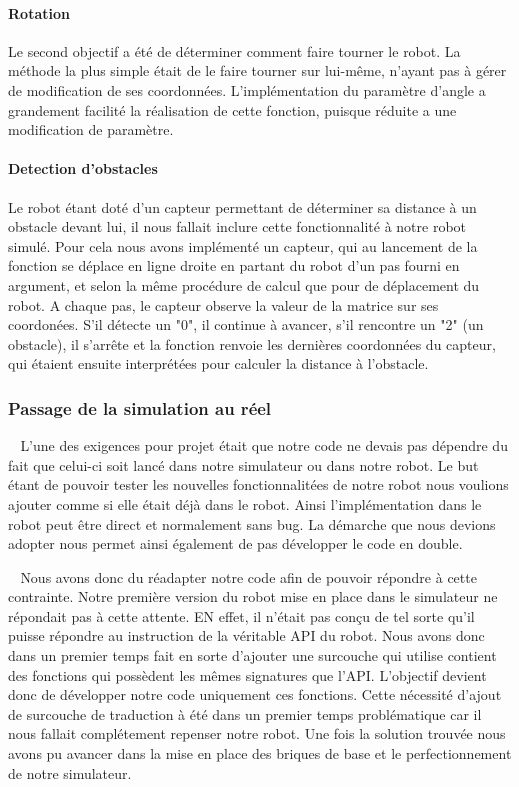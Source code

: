 \documentclass[12pt]{article}
\def\tab{$\>\>\>\>$}
\begin{document}
\paragraph{Rotation\\}
Le second objectif a été de déterminer comment faire tourner le robot. La méthode la plus simple était de le faire tourner sur lui-même, n'ayant pas à gérer de modification de ses coordonnées. L'implémentation du paramètre d'angle a grandement facilité la réalisation de cette fonction, puisque réduite a une modification de paramètre.

\paragraph{Detection d'obstacles\\}
Le robot étant doté d'un capteur permettant de déterminer sa distance à un obstacle devant lui, il nous fallait inclure cette fonctionnalité à notre robot simulé. Pour cela nous avons implémenté un capteur, qui au lancement de la fonction se déplace en ligne droite en partant du robot d'un pas fourni en argument, et selon la même procédure de calcul que pour de déplacement du robot. A chaque pas, le capteur observe la valeur de la matrice sur ses coordonées. S'il détecte un "0", il continue à avancer, s'il rencontre un "2" (un obstacle), il s'arrête et la fonction renvoie les dernières coordonnées du capteur, qui étaient ensuite interprétées pour calculer la distance à l'obstacle.

\subsubsection{Passage de la simulation au réel}
\tab L'une des exigences pour projet était que notre code ne devais pas dépendre du fait que celui-ci soit lancé dans notre simulateur ou dans notre robot. Le but étant de pouvoir tester les nouvelles fonctionnalitées de notre robot nous voulions ajouter comme si elle était déjà dans le robot. Ainsi l'implémentation dans le robot peut être direct et normalement sans bug. La démarche que nous devions adopter nous permet ainsi également de pas développer le code en double.

\tab Nous avons donc du réadapter notre code afin de pouvoir répondre à cette contrainte. Notre première version du robot mise en place dans le simulateur ne répondait pas à cette attente. EN effet, il n'était pas conçu de tel sorte qu'il puisse répondre au instruction de la véritable API du robot. Nous avons donc dans un premier temps fait en sorte d'ajouter une surcouche qui utilise contient des fonctions qui possèdent les mêmes signatures que l'API. L'objectif devient donc de développer notre code uniquement ces fonctions. Cette nécessité d'ajout de surcouche de traduction à été dans un premier temps problématique car il nous fallait complétement repenser notre robot. Une fois la solution trouvée nous avons pu avancer dans la mise en place des briques de base et le perfectionnement de notre simulateur.
\end{document}
